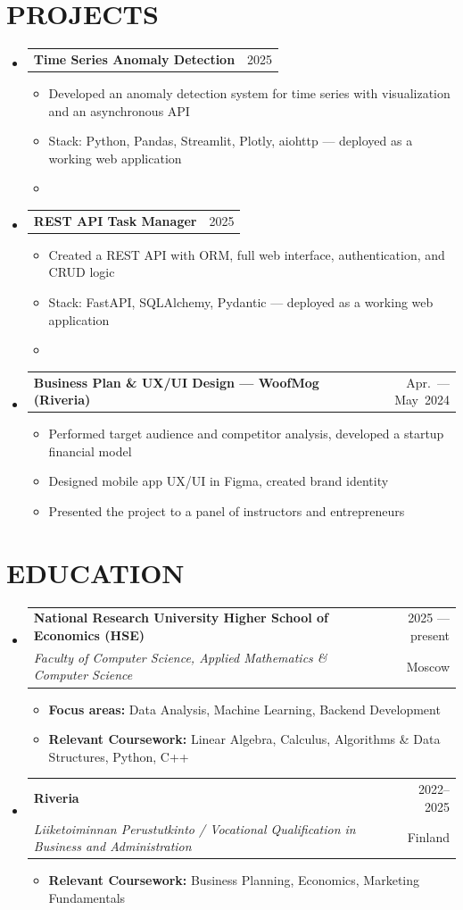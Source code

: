 \documentclass[letterpaper,11pt]{article}
\makeatletter
\newcommand{\myuline}[1]{%
  \uline{\phantom{#1}}%
  \llap{\contour{white}{#1}}%
}
\newcommand{\resumeItem}[1]{
  \item\small{
    {#1 \vspace{-1pt}}
  }
}
\newcommand{\resumeSubheading}[4]{
  \vspace{-1pt}\item
    \begin{tabular*}{\textwidth}[t]{l@{\extracolsep{\fill}}r}
      \textbf{#1} & {\color{dark-grey}\small #2}\vspace{1pt}\\
      \textit{#3} & {\color{dark-grey} \small #4}\\
    \end{tabular*}\vspace{-4pt}
}
\newcommand{\resumeProjectHeading}[2]{
    \item
    \begin{tabular*}{\textwidth}{l@{\extracolsep{\fill}}r}
      #1 & {\color{dark-grey}\small #2} \\
    \end{tabular*}\vspace{-4pt}
}
\newcommand{\resumeSubHeadingListStart}{\begin{itemize}[leftmargin=0in, label={}]}
\newcommand{\resumeSubHeadingListEnd}{\end{itemize}}
\newcommand{\resumeItemListStart}{\begin{itemize}}
\newcommand{\resumeItemListEnd}{\end{itemize}\vspace{0pt}}
\makeatother
\begin{document}
\section{PROJECTS}
    \resumeSubHeadingListStart
      \resumeProjectHeading
          {\textbf{Time Series Anomaly Detection}}{2025}
          \resumeItemListStart
            \resumeItem{Developed an anomaly detection system for time series with visualization and an asynchronous API}
            \resumeItem{Stack: Python, Pandas, Streamlit, Plotly, aiohttp --- deployed as a working web application}
            \resumeItem{\href{https://github.com/odnorodnyy/hw_temperature_analysis}{\myuline {GitHub}}}
          \resumeItemListEnd
      \resumeProjectHeading
          {\textbf{REST API Task Manager}}{2025}
          \resumeItemListStart
            \resumeItem{Created a REST API with ORM, full web interface, authentication, and CRUD logic}
            \resumeItem{Stack: FastAPI, SQLAlchemy, Pydantic --- deployed as a working web application}
            \resumeItem{\href{https://github.com/odnorodnyy/hw_fastapi}{\myuline {GitHub}}}       
          \resumeItemListEnd
      \resumeProjectHeading
          {\textbf{Business Plan \& UX/UI Design --- WoofMog (Riveria)}}{Apr.~--- May~2024}
          \resumeItemListStart
            \resumeItem{Performed target audience and competitor analysis, developed a startup financial model}
            \resumeItem{Designed mobile app UX/UI in Figma, created brand identity}
            \resumeItem{Presented the project to a panel of instructors and entrepreneurs}
          \resumeItemListEnd
    \resumeSubHeadingListEnd

\section{EDUCATION}
  \resumeSubHeadingListStart
    \resumeSubheading
      {National Research University Higher School of Economics (HSE)}{2025 --- present}
      {Faculty of Computer Science, Applied Mathematics \& Computer Science}{Moscow}
      \resumeItemListStart
        \resumeItem{\textbf{Focus areas:} Data Analysis, Machine Learning, Backend Development}
        \resumeItem{\textbf{Relevant Coursework:} Linear Algebra, Calculus, Algorithms \& Data Structures, Python, C++}
      \resumeItemListEnd
    \resumeSubheading
      {Riveria}{2022--2025}
      {Liiketoiminnan Perustutkinto / Vocational Qualification in Business and Administration}{Finland}
      \resumeItemListStart
        \resumeItem{\textbf{Relevant Coursework:} Business Planning, Economics, Marketing Fundamentals}
      \resumeItemListEnd
  \resumeSubHeadingListEnd
\end{document}
